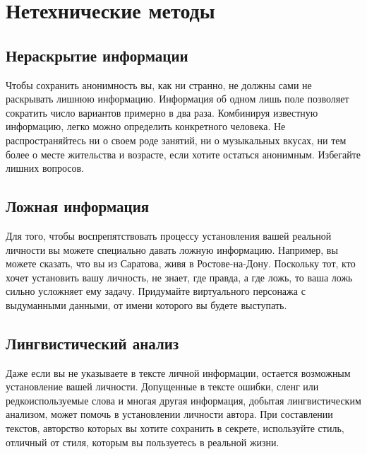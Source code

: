 \chapter{Нетехнические методы}
\section{Нераскрытие информации}
Чтобы сохранить анонимность вы, как ни странно, не должны сами не раскрывать лишнюю информацию. Информация об одном лишь поле позволяет сократить число вариантов примерно в два раза. Комбинируя известную информацию, легко можно определить конкретного человека. Не распространяйтесь ни о своем роде занятий, ни о музыкальных вкусах, ни тем более о месте жительства и возрасте, если хотите остаться анонимным. Избегайте лишних вопросов.
\section{Ложная информация}
Для того, чтобы воспрепятствовать процессу установления вашей реальной личности вы можете специально давать ложную информацию. Например, вы можете сказать, что вы из Саратова, живя в Ростове-на-Дону. Поскольку тот, кто хочет установить вашу личность, не знает, где правда, а где ложь, то ваша ложь сильно усложняет ему задачу. Придумайте виртуального персонажа с выдуманными данными, от имени которого вы будете выступать.
\section{Лингвистический анализ}
Даже если вы не указываете в тексте личной информации, остается возможным установление вашей личности. Допущенные в тексте ошибки, сленг или редкоиспользуемые слова и многая другая информация, добытая лингвистическим анализом, может помочь в установлении личности автора. При составлении текстов, авторство которых вы хотите сохранить в секрете, используйте стиль, отличный от стиля, которым вы пользуетесь в реальной жизни.
